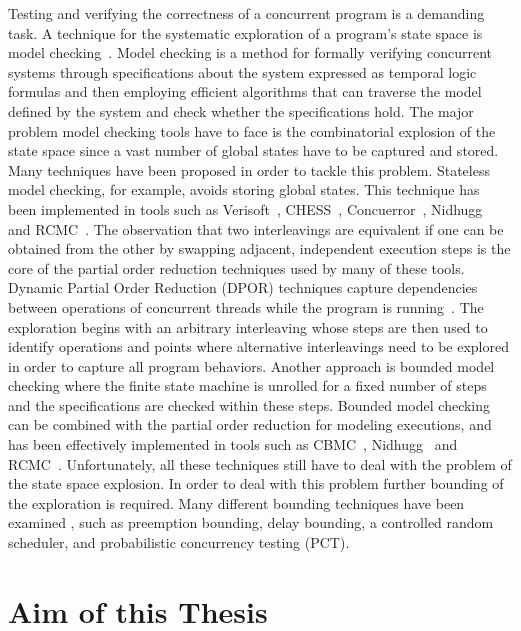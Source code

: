 Testing and verifying the correctness of a concurrent program is a demanding task. 
A technique for the systematic exploration of a program's state space is model checking~\cite{WikipediaModelChecking}.
Model checking is a method for formally verifying concurrent systems through specifications about the system expressed as 
temporal logic formulas and then employing efficient algorithms that can traverse the model defined by the system and check whether
the specifications hold. The major problem model checking tools have to face is the combinatorial explosion of the state space since
a vast number of global states have to be captured and stored. Many techniques have been proposed in order to tackle this problem.
Stateless model checking, for example, avoids storing global states. This technique has been implemented in tools such as Verisoft~\cite{SMC,Gode05}, 
CHESS~\cite{Musu08}, Concuerror~\cite{Chri13}, Nidhugg~\cite{AbdullaAronisAtigJonssonLeonardssonSagonasSMC2015} and RCMC~\cite{RCMC}. The observation that two 
interleavings are equivalent if one can be obtained from the other by swapping adjacent, independent execution steps is the core of the partial
order reduction \cite{Valmari1991, Peled1993, Godefroid1996,POR,JACM} techniques used by many of these tools. Dynamic Partial Order Reduction (DPOR) techniques
capture dependencies between operations of concurrent threads while the program is running~\cite{FlanaganDPOR,JACM}. The exploration begins with an arbitrary interleaving whose steps are then
used to identify operations and points where alternative interleavings need to
be explored in order to capture all program behaviors. Another approach is bounded model checking \cite{BoundedModelChecking} where the finite state
machine is unrolled for a fixed number of steps and the specifications are checked within these steps. Bounded model checking can be combined with the partial
order reduction for modeling executions, and has been effectively implemented in tools such as CBMC~\cite{CBMC}, Nidhugg~\cite{AbdullaAronisJohnssonSagonasDPOR2014} and RCMC~\cite{RCMC}.
Unfortunately, all these techniques still have to deal with the problem of the state space explosion. In order to deal with this problem further
bounding of the exploration is required. Many different bounding techniques have been examined \cite{Thomson}, such as preemption bounding, delay bounding, a controlled random scheduler, and probabilistic concurrency testing (PCT).

\section{Aim of this Thesis}

